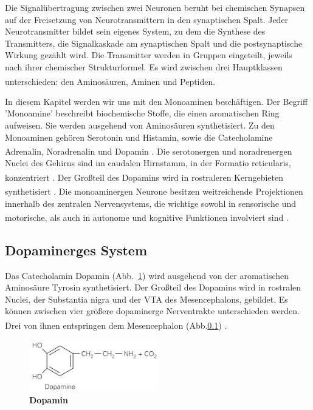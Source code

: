 \documentclass[12pt,a4paper,pdftex]{article}
\begin{document}
Die Signalübertragung zwischen zwei Neuronen beruht bei chemischen Synapsen auf der Freisetzung von Neurotransmittern in den synaptischen Spalt. Jeder Neurotransmitter bildet sein eigenes System, zu dem die Synthese des Transmitters, die Signalkaskade am synaptischen Spalt und die postsynaptische Wirkung gezählt wird. 
Die Transmitter werden in Gruppen eingeteilt, jeweils nach ihrer chemischer Strukturformel. Es wird zwischen drei Hauptklassen unterschieden: den Aminosäuren, Aminen und Peptiden. \textsuperscript{\cite[6]{neurowissenschaften_baer}}

In diesem Kapitel werden wir uns mit den Monoaminen beschäftigen.
Der Begriff 'Monoamine'  beschreibt biochemische Stoffe, die einen aromatischen Ring aufweisen. Sie werden ausgehend von Aminosäuren synthetisiert. Zu den Monoaminen gehören Serotonin und Histamin, sowie die Catecholamine Adrenalin, Noradrenalin und Dopamin \textsuperscript{\cite[46]{kandel2013principles}}. Die serotonergen und noradrenergen Nuclei des Gehirns sind im caudalen Hirnstamm, in der Formatio reticularis, konzentriert \textsuperscript{\cite[7]{trepel2011neuroanatomie}}.
Der Großteil des Dopamins wird in rostraleren Kerngebieten synthetisiert \textsuperscript{\cite[63]{kandel2013principles}}.
Die monoaminergen Neurone besitzen weitreichende Projektionen innerhalb des zentralen Nervensystems, die wichtige sowohl in sensorische und motorische, als auch in autonome und kognitive Funktionen involviert sind \textsuperscript{\cite[9]{crossman2014neuroanatomy}}.


\subsection{Dopaminerges System}
\label{dopaminerges_system}
Das Catecholamin Dopamin (Abb.~\ref{fig:dopamin}) wird ausgehend von der aromatischen Aminosäure Tyrosin synthetisiert. Der Großteil des Dopamins wird in rostralen Nuclei, der Substantia nigra  und der VTA des Mesencephalons, gebildet. Es können zwischen vier größere dopaminerge Nerventrakte unterschieden werden. Drei von ihnen entspringen dem Mesencephalon (Abb.\ref{dopaminerges_system}) \textsuperscript{\cite[13]{kandel2013principles}}. 


\begin{figure}[H]
    \centering
    \includegraphics[width=0.5\textwidth]{pictures/Bilder_monoamine_systeme/dopamin.PNG}
    \caption{\textbf{Dopamin}}
    \label{fig:dopamin}
\end{figure}{}
\end{document}
